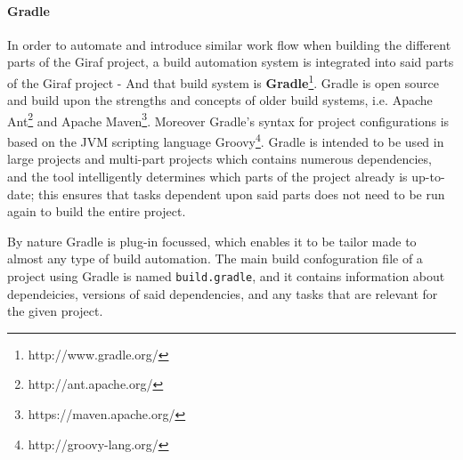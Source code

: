 \paragraph{Gradle}
In order to automate and introduce similar work flow when building the different parts of the Giraf project, a build automation system is integrated into said parts of the Giraf project - And that build system is \textbf{Gradle}\footnote{http://www.gradle.org/}.
Gradle is open source and build upon the strengths and concepts of older build systems, i.e. Apache Ant\footnote{http://ant.apache.org/} and Apache Maven\footnote{https://maven.apache.org/}.
Moreover Gradle's syntax for project configurations is based on the JVM scripting language Groovy\footnote{http://groovy-lang.org/}.
Gradle is intended to be used in large projects and multi-part projects which contains numerous dependencies, and the tool intelligently determines which parts of the project already is up-to-date; this ensures that tasks dependent upon said parts does not need to be run again to build the entire project. 

By nature Gradle is plug-in focussed, which enables it to be tailor made to almost any type of build automation.
The main build confoguration file of a project using Gradle is named \texttt{build.gradle}, and it contains information about dependeicies, versions of said dependencies, and any tasks that are relevant for the given project.

